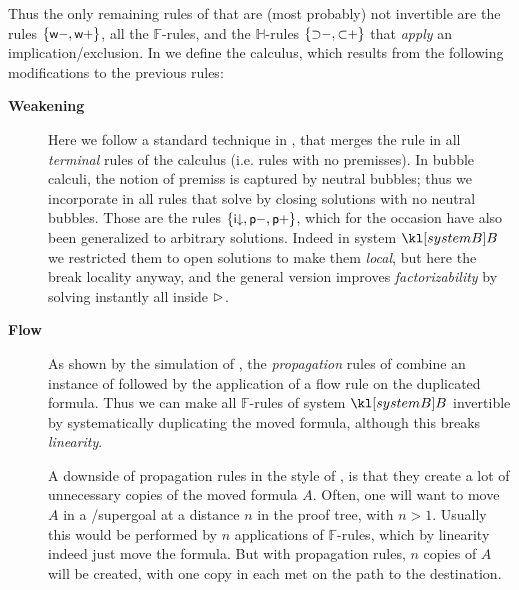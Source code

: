Thus the only remaining rules of  that are (most probably) not
invertible are the  rules $\{\text{\small$\mathsf{w{-}}$},\text{\small$\mathsf{w{+}}$}\}$, all the
$\mathbb{F}$-rules, and the $\mathbb{H}$-rules $\{\text{\small$\mathsf{{\supset}{-}}$},
\text{\small$\mathsf{{\subset}{+}}$}\}$ that \emph{apply} an implication/exclusion.
In  we define the  calculus, which results
from the following modifications to the previous rules:
\begin{description}
  \item[\textbf{Weakening}]
    Here we follow a standard technique in , that merges the
     rule in all \emph{terminal} rules of the calculus (i.e. rules with
    no premisses). In bubble calculi, the notion of premiss is captured by
    neutral bubbles; thus we incorporate  in all rules that solve
     by closing solutions with no neutral bubbles. Those are the rules
    $\{\text{\small$\mathsf{i{\downarrow}}$},\text{\small$\mathsf{p{-}}$},\text{\small$\mathsf{p{+}}$}\}$, which for the occasion have
    also been generalized to arbitrary solutions. Indeed in system $\sysB$ we
    restricted them to open solutions to make them \emph{local}, but here the
     break locality anyway, and the general version improves
    \emph{factorizability} by solving instantly all  inside $\mathbin{\rhd}$.

  \item[\textbf{Flow}]
    As shown by the simulation of , the
    \emph{propagation} rules of  combine an instance of
    \emph{} followed by the application of a flow rule on the
    duplicated formula. Thus we can make all $\mathbb{F}$-rules of system
    $\sysB$ invertible by systematically duplicating the moved formula, although
    this breaks \emph{linearity}.

    A downside of propagation rules in the style of , is that they
    create a lot of unnecessary copies of the moved formula $A$. Often, one will
    want to move $A$ in a /supergoal at a distance $n$ in the proof tree,
    with $n > 1$. Usually this would be performed by $n$ applications of
    $\mathbb{F}$-rules, which by linearity indeed just move the formula. But with
    propagation rules, $n$ copies of $A$ will be created, with one copy in each
     met on the path to the destination.


\end{description}
